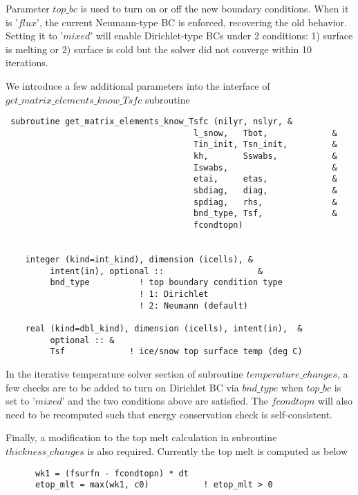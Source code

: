 \documentclass[10pt,letterpaper,oneside]{article}
\begin{document}
Parameter $top\_bc$ is used to turn on or off the new boundary conditions. When it is '$flux$', the current
Neumann-type BC is enforced, recovering the old behavior. Setting it to '$mixed$' will enable Dirichlet-type BCs under 2 conditions: 1) surface is melting or 2) surface is cold but the solver did not converge within 10 iterations.

We introduce a few additional parameters into the interface of $get\_matrix\_elements\_know\_Tsfc$  subroutine

\begin{lstlisting}
 subroutine get_matrix_elements_know_Tsfc (nilyr, nslyr, &
                                      l_snow,   Tbot,             &
                                      Tin_init, Tsn_init,         &
                                      kh,       Sswabs,           &
                                      Iswabs,                     &
                                      etai,     etas,             &
                                      sbdiag,   diag,             &
                                      spdiag,   rhs,              &
                                      bnd_type, Tsf,              &
                                      fcondtopn)
                                      
                                      
    integer (kind=int_kind), dimension (icells), &
         intent(in), optional ::                   &
         bnd_type          ! top boundary condition type
                           ! 1: Dirichlet 
                           ! 2: Neumann (default)
      
    real (kind=dbl_kind), dimension (icells), intent(in),  &
         optional :: &
         Tsf             ! ice/snow top surface temp (deg C)   
\end{lstlisting}

In the iterative temperature solver section of subroutine $temperature\_changes$, a few checks are to be added to turn on Dirichlet BC via $bnd\_type$ when $top\_bc$ is set to '$mixed$' and the two conditions above are satisfied. The $fcondtopn$ will also need to be recomputed such that energy conservation check is self-consistent. 

Finally, a modification to the top melt calculation in subroutine $thickness\_changes$ is also required. Currently the top melt is computed as below

\begin{lstlisting}
      wk1 = (fsurfn - fcondtopn) * dt
      etop_mlt = max(wk1, c0)           ! etop_mlt > 0   
\end{lstlisting}
 
\end{document}
